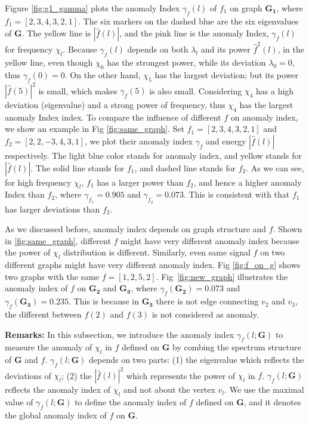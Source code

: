 Figure \ref{fig:g1_gamma} plots the anomaly Index $\gamma_f(l)$ of $f_1$ on graph $\mathbf{G_1}$, where $f_1=[2,3,4,3,2,1]$. The six markers on the dashed blue are the six eigenvalues of $\mathbf{G}$. The yellow line is $|\hat{f}(l)|$, and the pink line is the anomaly Index, $\gamma_f(l)$ for frequency $\chi_l$. Because $\gamma_f(l)$ depends on both $\lambda_l$ and its power $\hat{f}^2(l)$, in the yellow line, even though $\chi_0$ has the strongest power,  while its deviation $\lambda_0 = 0$, thus  $\gamma_f(0)=0$. On the other hand, $\chi_5$ has the largest deviation; but its power $|\hat{f}(5)|^2$ is small, which makes $\gamma_f(5)$ is also small. Considering $\chi_4$ has a high deviation (eigenvalue) and a strong power of frequency, thus $\chi_4$  has the largest anomaly Index index. To compare the influence of different $f$ on anomaly index, we show an example in Fig \ref{fig:same_graph}. Set $f_1=[2,3,4,3,2,1]$ and $f_2=[2,2,-3,4,3,1]$, we plot their anomaly index $\gamma_{f}$ and energy $|\hat{f}(l)|$ respectively.
The light blue color stands for anomaly index, and yellow stands for $|\hat{f}(l)|$. The solid line stands for $f_1$, and dashed line stands for $f_2$. As we can see, for high frequency $\chi_l$, $f_1$ has a larger power than $f_2$, and hence a higher anomaly Index than $f_2$, where $\gamma_{f_1}=0.905$ and $\gamma_{f_2}=0.073$. This is consistent with that $f_1$ has larger deviations than $f_2$.

 As we discussed before, anomaly index depends on graph structure and $f$. Shown in \ref{fig:same_graph}, different $f$ might have very different anomaly index because the power of $\chi_l$ distribution is different. Similarly, even same signal $f$ on two different graphs might have very different anomaly index. Fig \ref{fig:f_on_g} shows two graphs with the same $f=[1,2,5,2]$. Fig~\ref{fig:new_graph} illustrates the anomaly index of $f$ on $\mathbf{G_2}$ and $\mathbf{G_3}$, where $\gamma_{f}(\mathbf{G_2})=0.073$ and $\gamma_{f}(\mathbf{G_3})=0.235$. {This is because in $\mathbf{G_3}$ there is not edge connecting $v_2$ and $v_3$, the different between $f(2)$ and $f(3)$ is not considered as anomaly.}


{\textbf{Remarks:}}
In this subsection, we introduce the anomaly index $\gamma_f(l;\mathbf{G})$ to measure the anomaly of $\chi_l$ in $f$ defined on $\mathbf{G}$ by combing the spectrum structure of $\mathbf{G}$ and $f$. $\gamma_f(l;\mathbf{G})$ depends on two parts: (1) the eigenvalue which reflects the deviations of $\chi_l$; (2) the $|\hat{f}(l)|^2$  which represents the power of $\chi_l$ in $f$. $\gamma_f(l;\mathbf{G})$ reflects the anomaly index of $\chi_l$ and not about the vertex $v_l$. We use the maximal value of $\gamma_f(l;\mathbf{G})$ to define the anomaly index of $f$ defined on $\mathbf{G}$, and it denotes the global anomaly index of $f$ on $\mathbf{G}$.


